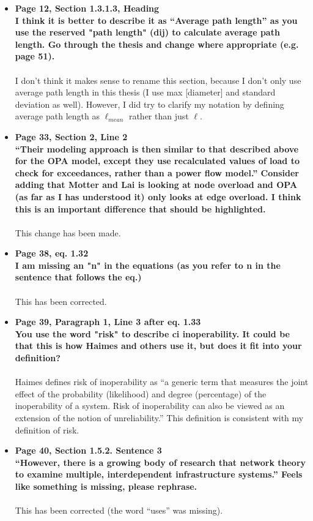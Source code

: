 \documentclass[a4paper,10pt]{article}
\begin{document}
\begin{itemize}
 \item \textbf{Page 12, Section 1.3.1.3, Heading \\
 I think it is better to describe it as ``Average path length'' as you use the reserved "path length" (dij) to calculate average path length. Go through the thesis and change where appropriate (e.g. page 51).}\\
 \\
 I don't think it makes sense to rename this section, because I don't only use average path length in this thesis (I use max [diameter] and standard deviation as well).  However, I did try to clarify my notation by defining average path length as $\ell_{mean}$ rather than just $\ell$.
 
 \item \textbf{Page 33, Section 2, Line 2 \\
 ``Their modeling approach is then similar to that described above for the OPA model, except they use recalculated values of load to check for exceedances, rather than a power flow model.'' Consider adding that Motter and Lai is looking at node overload and OPA (as far as I has understood it) only looks at edge overload. I think this is an important difference that should be highlighted.}\\
 \\
 This change has been made.
 
 \item \textbf{Page 38, eq. 1.32 \\
 I am missing an "n" in the equations (as you refer to n in the sentence that follows the eq.)}\\
 \\
 This has been corrected.
 
 \item \textbf{Page 39, Paragraph 1, Line 3 after eq. 1.33 \\
 You use the word "risk" to describe ci inoperability. It could be that this is how Haimes and others use it, but does it fit into your definition?}\\
 \\
 Haimes defines risk of inoperability as ``a generic term that measures the joint effect of the probability (likelihood) and degree
(percentage) of the inoperability of a system. Risk of inoperability can also be viewed as an extension of the notion of unreliability.'' This definition is consistent with my definition of risk.
 
 \item \textbf{Page 40, Section 1.5.2. Sentence 3 \\
 ``However, there is a growing body of research that network theory to examine multiple, interdependent infrastructure systems.'' Feels like something is missing, please rephrase.}\\
 \\
 This has been corrected (the word ``uses'' was missing).
 

\end{itemize}
\end{document}

